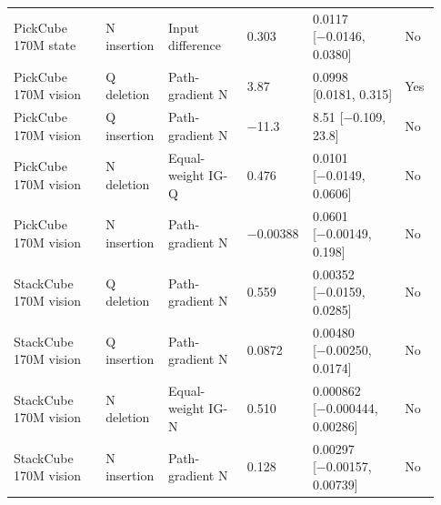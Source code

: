 \begin{longtable}{p{0.210\linewidth} p{0.140\linewidth} p{0.180\linewidth} p{0.110\linewidth} p{0.210\linewidth} p{0.080\linewidth}}
PickCube 170M state & N insertion & Input difference & 0.303 & 0.0117 [−0.0146, 0.0380] & No \\
PickCube 170M vision & Q deletion & Path-gradient N & 3.87 & 0.0998 [0.0181, 0.315] & Yes \\
PickCube 170M vision & Q insertion & Path-gradient N & −11.3 & 8.51 [−0.109, 23.8] & No \\
PickCube 170M vision & N deletion & Equal-weight IG-Q & 0.476 & 0.0101 [−0.0149, 0.0606] & No \\
PickCube 170M vision & N insertion & Path-gradient N & −0.00388 & 0.0601 [−0.00149, 0.198] & No \\
StackCube 170M vision & Q deletion & Path-gradient N & 0.559 & 0.00352 [−0.0159, 0.0285] & No \\
StackCube 170M vision & Q insertion & Path-gradient N & 0.0872 & 0.00480 [−0.00250, 0.0174] & No \\
StackCube 170M vision & N deletion & Equal-weight IG-N & 0.510 & 0.000862 [−0.000444, 0.00286] & No \\
StackCube 170M vision & N insertion & Path-gradient N & 0.128 & 0.00297 [−0.00157, 0.00739] & No \\
\end{longtable}

